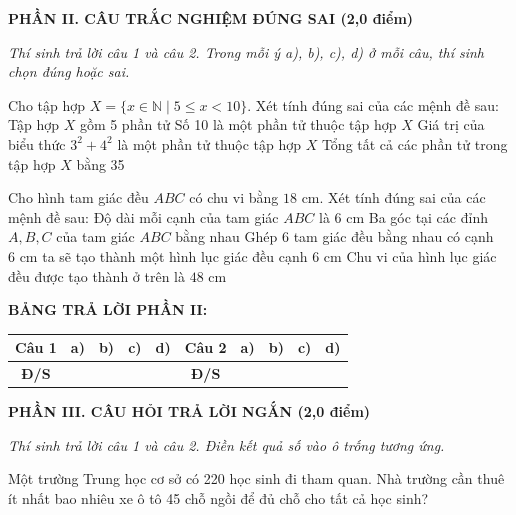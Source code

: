 \documentclass[12pt,a4paper]{article}
\begin{document}
\setcounter{ex}{0}
\noindent\textbf{\large PHẦN II. CÂU TRẮC NGHIỆM ĐÚNG SAI (2,0 điểm)}

\textit{Thí sinh trả lời câu 1 và câu 2. Trong mỗi ý a), b), c), d) ở mỗi câu, thí sinh chọn đúng hoặc sai.}

\vspace{1mm}
\begin{ex}
Cho tập hợp $X = \{x \in \mathbb{N} \mid 5 \le x < 10\}$. Xét tính đúng sai của các mệnh đề sau:
\choiceTF
{\True Tập hợp $X$ gồm 5 phần tử}
{Số 10 là một phần tử thuộc tập hợp $X$}
{Giá trị của biểu thức $3^2 + 4^2$ là một phần tử thuộc tập hợp $X$}
{\True Tổng tất cả các phần tử trong tập hợp $X$ bằng 35}
\end{ex}

\begin{ex}
Cho hình tam giác đều $ABC$ có chu vi bằng $18\text{ cm}$. Xét tính đúng sai của các mệnh đề sau:
\choiceTF
{\True Độ dài mỗi cạnh của tam giác $ABC$ là $6\text{ cm}$}
{\True Ba góc tại các đỉnh $A, B, C$ của tam giác $ABC$ bằng nhau}
{\True Ghép 6 tam giác đều bằng nhau có cạnh $6\text{ cm}$ ta sẽ tạo thành một hình lục giác đều cạnh $6\text{ cm}$}
{Chu vi của hình lục giác đều được tạo thành ở trên là $48\text{ cm}$}
\end{ex}


\noindent\textbf{BẢNG TRẢ LỜI PHẦN II:}
\begin{center}
\begin{tabular}{|c|c|c|c|c||c|c|c|c|c|}
\hline
\textbf{Câu 1} & \textbf{a)} & \textbf{b)} & \textbf{c)} & \textbf{d)} & \textbf{Câu 2} & \textbf{a)} & \textbf{b)} & \textbf{c)} & \textbf{d)} \\
\hline
\textbf{Đ/S} & \rule{0pt}{0.6cm} & & & & \textbf{Đ/S} & & & & \\
\hline
\end{tabular}
\end{center}
\vspace{2mm}

\setcounter{ex}{0}
\noindent\textbf{\large PHẦN III. CÂU HỎI TRẢ LỜI NGẮN (2,0 điểm)}

\textit{Thí sinh trả lời câu 1 và câu 2. Điền kết quả số vào ô trống tương ứng.}

\vspace{1mm}
\begin{ex}
Một trường Trung học cơ sở có 220 học sinh đi tham quan. Nhà trường cần thuê ít nhất bao nhiêu xe ô tô 45 chỗ ngồi để đủ chỗ cho tất cả học sinh? 
\end{ex}
\end{document}

